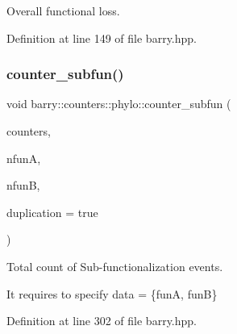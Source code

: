 Overall functional loss. 



Definition at line 149 of file barry.\+hpp.

\mbox{\label{namespacebarry_1_1counters_1_1phylo_ad36131d4405a758fa200fd29932f49ea}} 
\subsubsection{\texorpdfstring{counter\+\_\+subfun()}{counter\_subfun()}}
{\footnotesize\ttfamily void barry\+::counters\+::phylo\+::counter\+\_\+subfun (\begin{DoxyParamCaption}\item[{\hyperlink{namespacebarry_1_1counters_1_1phylo_a4e401ffe66d04091343dcffaf915f8c3}{Phylo\+Counters} $\ast$}]{counters,  }\item[{\hyperlink{namespacebarry_a11dfc53ddb4672278319aa04f1e09a6c}{uint}}]{nfunA,  }\item[{\hyperlink{namespacebarry_a11dfc53ddb4672278319aa04f1e09a6c}{uint}}]{nfunB,  }\item[{bool}]{duplication = {\ttfamily true} }\end{DoxyParamCaption})\hspace{0.3cm}{\ttfamily [inline]}}



Total count of Sub-\/functionalization events. 

It requires to specify data = \{funA, funB\} 

Definition at line 302 of file barry.\+hpp.

